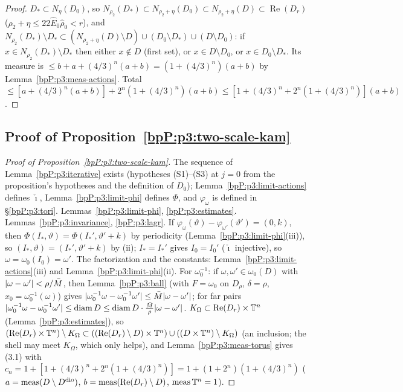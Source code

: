 \begin{proof}
\label{stepP:p3:mt-shell}
$D_*\subset N_\eta(D_0)$, so $N_{\rho_2}(D_*)\subset N_{\rho_2+\eta}(D_0)\subset N_{\rho_2+\eta}(D)\subset\operatorname{Re}(D_r)$ ($\rho_2+\eta\le22\hat E_0\hat\rho_0<r$), and $N_{\rho_2}(D_*)\setminus D_*\subset(N_{\rho_2+\eta}(D)\setminus D)\cup(D_0\setminus D_*)\cup(D\setminus D_0)$: if $x\in N_{\rho_2}(D_*)\setminus D_*$ then either $x\notin D$ (first set), or $x\in D\setminus D_0$, or $x\in D_0\setminus D_*$. Its measure is $\le b+a+(4/3)^n(a+b)=(1+(4/3)^n)(a+b)$ by Lemma~\ref{bpP:p3:meas-actions}.
\label{stepP:p3:mt-sum}
Total $\le[a+(4/3)^n(a+b)]+2^n(1+(4/3)^n)(a+b)\le[1+(4/3)^n+2^n(1+(4/3)^n)](a+b)$.
\end{proof}

\subsection{Proof of Proposition~\ref{bpP:p3:two-scale-kam}}\label{bpP:p3:proof}

\begin{proof}[Proof of Proposition~\ref{bpP:p3:two-scale-kam}]
\label{stepP:p3:pf-constr}
The sequence of Lemma~\ref{bpP:p3:iterative} exists (hypotheses (S1)--(S3) at $j=0$ from the proposition's hypotheses and the definition of $D_0$); Lemma~\ref{bpP:p3:limit-actions} defines $\check\imath$, Lemma~\ref{bpP:p3:limit-phi} defines $\Phi$, and $\varphi_\omega$ is defined in \S\ref{bpP:p3:tori}.
\label{stepP:p3:pf-ad}
Lemmas~\ref{bpP:p3:limit-phi}, \ref{bpP:p3:estimates}.
\label{stepP:p3:pf-bc}
Lemmas~\ref{bpP:p3:invariance}, \ref{bpP:p3:lagr}.
\label{stepP:p3:pf-inj}
If $\varphi_\omega(\vartheta)-\varphi_{\omega'}(\vartheta')=(0,k)$, then $\Phi(I_*,\vartheta)=\Phi(I_*',\vartheta'+k)$ by periodicity (Lemma~\ref{bpP:p3:limit-phi}(iii)), so $(I_*,\vartheta)=(I_*',\vartheta'+k)$ by (ii); $I_*=I_*'$ gives $I_0=I_0'$ ($\check\imath$ injective), so $\omega=\omega_0(I_0)=\omega'$. The factorization and the constants: Lemma~\ref{bpP:p3:limit-actions}(iii) and Lemma~\ref{bpP:p3:limit-phi}(ii). For $\omega_0^{-1}$: if $\omega,\omega'\in\omega_0(D)$ with $\lvert \omega-\omega'\rvert<\rho/\bar M$, then Lemma~\ref{bpP:p3:ball} (with $F=\omega_0$ on $D_\rho$, $\delta=\rho$, $x_0=\omega_0^{-1}(\omega)$) gives $\lvert \omega_0^{-1}\omega-\omega_0^{-1}\omega'\rvert\le\bar M\lvert \omega-\omega'\rvert$; for far pairs $\lvert \omega_0^{-1}\omega-\omega_0^{-1}\omega'\rvert\le\operatorname{diam}D\le\operatorname{diam}D\cdot\frac{\bar M}{\rho}\lvert \omega-\omega'\rvert$.
\label{stepP:p3:pf-meas}
$K_\Omega\subset\operatorname{Re}(D_r)\times\mathbb{T}^n$ (Lemma~\ref{bpP:p3:estimates}), so $(\operatorname{Re}(D_r)\times\mathbb{T}^n)\setminus K_\Omega\subset((\operatorname{Re}(D_r)\setminus D)\times\mathbb{T}^n)\cup((D\times\mathbb{T}^n)\setminus K_\Omega)$ (an inclusion; the shell may meet $K_\Omega$, which only helps), and Lemma~\ref{bpP:p3:meas-torus} gives (3.1) with $c_n=1+[1+(4/3)^n+2^n(1+(4/3)^n)]=1+(1+2^n)(1+(4/3)^n)$ ($a=\operatorname{meas}(D\setminus D^{\rm dio})$, $b=\operatorname{meas}(\operatorname{Re}(D_r)\setminus D)$, $\operatorname{meas}\mathbb{T}^n=1$).
\end{proof}

